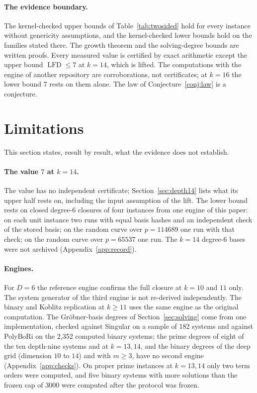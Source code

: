 \documentclass[11pt]{article}
\theoremstyle{definition}\newtheorem{definition}[theorem]{Definition}
\theoremstyle{remark}\newtheorem{remark}[theorem]{Remark}
\newcommand{\lfd}{\operatorname{LFD}}
\begin{document}
\paragraph{The evidence boundary.} The kernel-checked upper bounds of
Table~\ref{tab:twosided} hold for every instance without genericity
assumptions, and the kernel-checked lower bounds hold on the families
stated there. The growth theorem and the solving-degree bounds are written
proofs. Every measured value is certified by exact arithmetic except the
upper bound $\lfd\le7$ at $k=14$, which is lifted. The computations with
the engine of another repository are corroborations, not certificates; at
$k=16$ the lower bound $7$ rests on them alone. The law of Conjecture~\ref{conj:law} is a conjecture.

\section{Limitations}\label{sec:limitations}
This section states, result by result, what the evidence does not
establish.

\paragraph{The value $7$ at $k=14$.} The value has no independent
certificate; Section~\ref{sec:depth14} lists what its upper half rests on,
including the input assumption of the lift. The lower bound rests on closed
degree-$6$ closures of four instances from one engine of this paper: on
each unit instance two runs with equal basis hashes and an independent check
of the stored basis; on the random curve over $p=114689$ one run with that
check; on the random curve over $p=65537$ one run. The $k=14$ degree-$6$
bases were not archived (Appendix~\ref{app:record}).

\paragraph{Engines.} For $D=6$ the reference engine confirms the full
closure at $k=10$ and $11$ only. The system generator of the third engine
is not re-derived independently. The binary and Koblitz replication at
$k\ge11$ uses the same engine as the original computation. The
Gr\"obner-basis degrees of Section~\ref{sec:solving} come from one
implementation, checked against Singular on a sample of 182 systems and
against PolyBoRi on the 2{,}352 computed binary systems; the prime degrees of
eight of the ten depth-nine systems and at $k=13,14$, and the binary degrees
of the deep grid (dimension $10$ to $14$) and with $m\ge3$, have no second
engine (Appendix~\ref{app:checks}). On proper prime instances at $k=13,14$
only two term orders were computed, and five binary systems with more
solutions than the frozen cap of $3000$ were computed after the protocol was
frozen.
\end{document}
